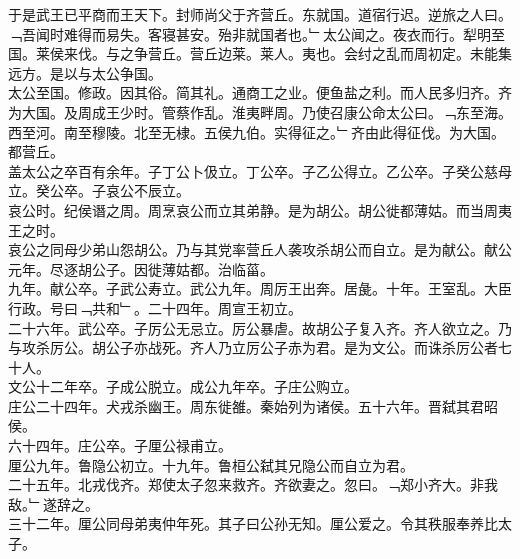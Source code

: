 \documentclass{zhvt-classic}
\begin{document}
\hspace*{2em}于是武王已平商而王天下。封师尚父于齐营丘。东就国。道宿行迟。逆旅之人曰。﹁吾闻时难得而易失。客寝甚安。殆非就国者也。﹂太公闻之。夜衣而行。犁明至国。莱侯来伐。与之争营丘。营丘边莱。莱人。夷也。会纣之乱而周初定。未能集远方。是以与太公争国。\\
\hspace*{2em}太公至国。修政。因其俗。简其礼。通商工之业。便鱼盐之利。而人民多归齐。齐为大国。及周成王少时。管蔡作乱。淮夷畔周。乃使召康公命太公曰。﹁东至海。西至河。南至穆陵。北至无棣。五侯九伯。实得征之。﹂齐由此得征伐。为大国。都营丘。\\
\hspace*{2em}盖太公之卒百有余年。子丁公卜伋立。丁公卒。子乙公得立。乙公卒。子癸公慈母立。癸公卒。子哀公不辰立。\\
\hspace*{2em}哀公时。纪侯谮之周。周烹哀公而立其弟静。是为胡公。胡公徙都薄姑。而当周夷王之时。\\
\hspace*{2em}哀公之同母少弟山怨胡公。乃与其党率营丘人袭攻杀胡公而自立。是为献公。献公元年。尽逐胡公子。因徙薄姑都。治临菑。\\
\hspace*{2em}九年。献公卒。子武公寿立。武公九年。周厉王出奔。居彘。十年。王室乱。大臣行政。号曰﹁共和﹂。二十四年。周宣王初立。\\
\hspace*{2em}二十六年。武公卒。子厉公无忌立。厉公暴虐。故胡公子复入齐。齐人欲立之。乃与攻杀厉公。胡公子亦战死。齐人乃立厉公子赤为君。是为文公。而诛杀厉公者七十人。\\
\hspace*{2em}文公十二年卒。子成公脱立。成公九年卒。子庄公购立。\\
\hspace*{2em}庄公二十四年。犬戎杀幽王。周东徙雒。秦始列为诸侯。五十六年。晋弑其君昭侯。\\
\hspace*{2em}六十四年。庄公卒。子厘公禄甫立。\\
\hspace*{2em}厘公九年。鲁隐公初立。十九年。鲁桓公弑其兄隐公而自立为君。\\
\hspace*{2em}二十五年。北戎伐齐。郑使太子忽来救齐。齐欲妻之。忽曰。﹁郑小齐大。非我敌。﹂遂辞之。\\
\hspace*{2em}三十二年。厘公同母弟夷仲年死。其子曰公孙无知。厘公爱之。令其秩服奉养比太子。\\
\end{document}

